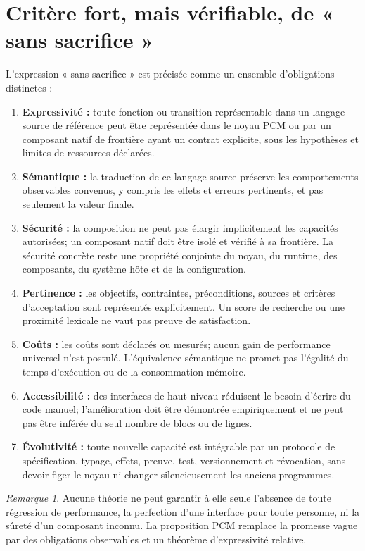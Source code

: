 \documentclass[11pt,a4paper,openany]{book}
\theoremstyle{definition}
\theoremstyle{plain}
\theoremstyle{remark}
\newtheorem{remark}[definition]{Remarque}
\begin{document}
\section{Critère fort, mais vérifiable, de « sans sacrifice »}
L'expression « sans sacrifice » est précisée comme un ensemble d'obligations distinctes :
\begin{enumerate}
\item \textbf{Expressivité :} toute fonction ou transition représentable dans un langage source de référence peut être représentée dans le noyau PCM ou par un composant natif de frontière ayant un contrat explicite, sous les hypothèses et limites de ressources déclarées.
\item \textbf{Sémantique :} la traduction de ce langage source préserve les comportements observables convenus, y compris les effets et erreurs pertinents, et pas seulement la valeur finale.
\item \textbf{Sécurité :} la composition ne peut pas élargir implicitement les capacités autorisées; un composant natif doit être isolé et vérifié à sa frontière. La sécurité concrète reste une propriété conjointe du noyau, du runtime, des composants, du système hôte et de la configuration.
\item \textbf{Pertinence :} les objectifs, contraintes, préconditions, sources et critères d'acceptation sont représentés explicitement. Un score de recherche ou une proximité lexicale ne vaut pas preuve de satisfaction.
\item \textbf{Coûts :} les coûts sont déclarés ou mesurés; aucun gain de performance universel n'est postulé. L'équivalence sémantique ne promet pas l'égalité du temps d'exécution ou de la consommation mémoire.
\item \textbf{Accessibilité :} des interfaces de haut niveau réduisent le besoin d'écrire du code manuel; l'amélioration doit être démontrée empiriquement et ne peut pas être inférée du seul nombre de blocs ou de lignes.
\item \textbf{Évolutivité :} toute nouvelle capacité est intégrable par un protocole de spécification, typage, effets, preuve, test, versionnement et révocation, sans devoir figer le noyau ni changer silencieusement les anciens programmes.
\end{enumerate}

\begin{remark}
Aucune théorie ne peut garantir à elle seule l'absence de toute régression de performance, la perfection d'une interface pour toute personne, ni la sûreté d'un composant inconnu. La proposition PCM remplace la promesse vague par des obligations observables et un théorème d'expressivité relative.
\end{remark}
\end{document}
